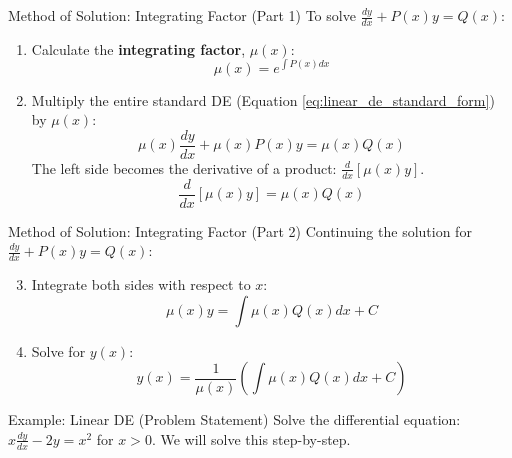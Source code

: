 \documentclass[10pt,aspectratio=169]{beamer}
\begin{document}
\begin{frame}{Method of Solution: Integrating Factor (Part 1)}
    To solve $\frac{dy}{dx} + P(x)y = Q(x)$:
    \begin{enumerate}
        \item Calculate the \textbf{integrating factor}, $\mu(x)$:
        \begin{equation}
            \mu(x) = e^{\int P(x)dx}
            \label{eq:integrating_factor}
        \end{equation}
        \item Multiply the entire standard DE (Equation \ref{eq:linear_de_standard_form}) by $\mu(x)$:
        \begin{equation}
            \mu(x)\frac{dy}{dx} + \mu(x)P(x)y = \mu(x)Q(x)
        \end{equation}
        The left side becomes the derivative of a product: $\frac{d}{dx}[\mu(x)y]$.
        \begin{equation}
            \frac{d}{dx}[\mu(x)y] = \mu(x)Q(x)
        \end{equation}
    \end{enumerate}
\end{frame}

\begin{frame}{Method of Solution: Integrating Factor (Part 2)}
    Continuing the solution for $\frac{dy}{dx} + P(x)y = Q(x)$:
    \begin{enumerate}
        \setcounter{enumi}{2} %
        \item Integrate both sides with respect to $x$:
        \begin{equation}
            \mu(x)y = \int \mu(x)Q(x)dx + C
        \end{equation}
        \item Solve for $y(x)$:
        \begin{equation}
            y(x) = \frac{1}{\mu(x)} \left( \int \mu(x)Q(x)dx + C \right)
            \label{eq:linear_de_solution}
        \end{equation}
    \end{enumerate}
\end{frame}

\begin{frame}{Example: Linear DE (Problem Statement)}
    Solve the differential equation: $x\frac{dy}{dx} - 2y = x^2$ for $x > 0$.
    \vspace{1em}
    We will solve this step-by-step.
\end{frame}
\end{document}
